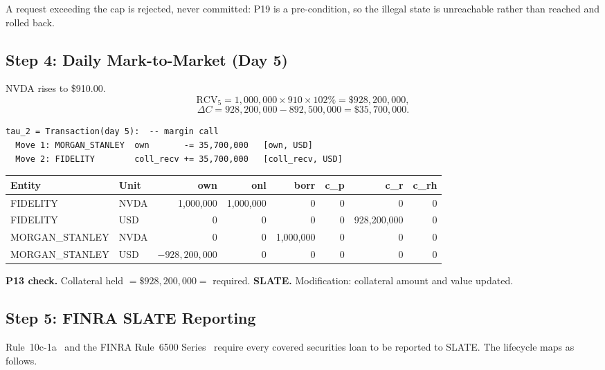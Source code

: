 \noindent A request exceeding the cap is rejected, never committed: P19 is a pre-condition, so the illegal state is unreachable rather than reached and rolled back.

\subsection{Step 4: Daily Mark-to-Market (Day 5)}
\label{sec:us-step4}

NVDA rises to \$910.00.
\[
\mathrm{RCV}_5 = 1{,}000{,}000 \times 910 \times 102\% = \$928{,}200{,}000,
\]
\[
\Delta C = 928{,}200{,}000 - 892{,}500{,}000 = \$35{,}700{,}000.
\]

\begin{lstlisting}
tau_2 = Transaction(day 5):  -- margin call
  Move 1: MORGAN_STANLEY  own       -= 35,700,000   [own, USD]
  Move 2: FIDELITY        coll_recv += 35,700,000   [coll_recv, USD]
\end{lstlisting}

\begin{center}\small
\begin{tabular}{l l r r r r r r}
\toprule
\textbf{Entity} & \textbf{Unit} & own & onl & borr & c\_p & c\_r & c\_rh \\
\midrule
FIDELITY & NVDA & 1{,}000{,}000 & 1{,}000{,}000 & 0 & 0 & 0 & 0 \\
FIDELITY & USD & 0 & 0 & 0 & 0 & 928{,}200{,}000 & 0 \\
\midrule
MORGAN\_STANLEY & NVDA & 0 & 0 & 1{,}000{,}000 & 0 & 0 & 0 \\
MORGAN\_STANLEY & USD & $-928{,}200{,}000$ & 0 & 0 & 0 & 0 & 0 \\
\bottomrule
\end{tabular}
\end{center}

\noindent\textbf{P13 check.} Collateral held $= \$928{,}200{,}000 =$ required. \checkmark\quad
\textbf{SLATE.} Modification: collateral amount and value updated.

\subsection{Step 5: FINRA SLATE Reporting}
\label{sec:us-step5}

Rule~10c-1a~\cite{sec10c1a} and the FINRA Rule~6500 Series~\cite{finra6500} require every covered securities loan to be reported to SLATE. The lifecycle maps as follows.

